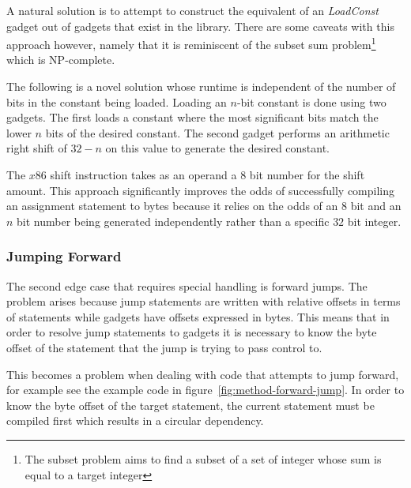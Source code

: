     A natural solution is to attempt to construct the equivalent of an
    \emph{LoadConst} gadget out of gadgets that exist in the library. There are
    some caveats with this approach however, namely that it is reminiscent of
    the subset sum problem\footnote{The subset problem aims to find a subset of
    a set of integer whose sum is equal to a target integer} which is
    NP-complete.

    The following is a novel solution whose runtime is independent of the number
    of bits in the constant being loaded. Loading an $n$-bit constant is done
    using two gadgets. The first loads a constant where the most significant
    bits match the lower $n$ bits of the desired constant. The second gadget
    performs an arithmetic right shift of $32-n$ on this value to generate the
    desired constant.

    The $x86$ shift instruction takes as an operand a $8$ bit number for the
    shift amount. This approach significantly improves the odds of successfully
    compiling an assignment statement to bytes because it relies on the odds of
    an $8$ bit and an $n$ bit number being generated independently rather than a
    specific $32$ bit integer.

    \subsubsection{Jumping Forward}

    The second edge case that requires special handling is forward jumps. The
    problem arises because jump statements are written with relative offsets in
    terms of statements while gadgets have offsets expressed in bytes. This
    means that in order to resolve jump statements to gadgets it is necessary to
    know the byte offset of the statement that the jump is trying to pass
    control to.

    This becomes a problem when dealing with code that attempts to jump forward,
    for example see the example code in figure~\ref{fig:method-forward-jump}.
    In order to know the byte offset of the target statement, the current
    statement must be compiled first which results in a circular dependency.

